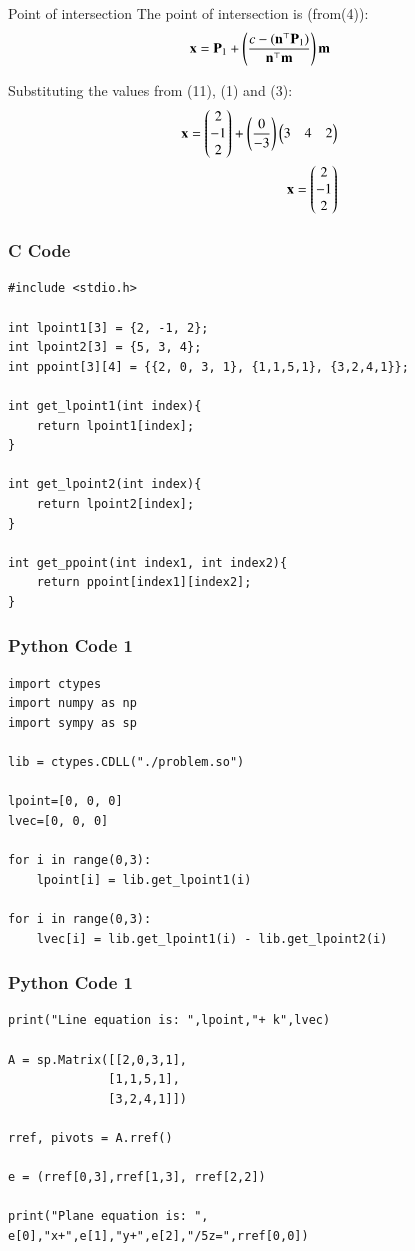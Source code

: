 \documentclass{beamer}
\begin{document}
\begin{frame}{Point of intersection}
The point of intersection is (from(4)):
\begin{align}
    \mathbf{x}=\mathbf{P}_1+\left(\frac{c-(\mathbf{n}^\top\mathbf{P}_1)}{\mathbf{n}^\top\mathbf{m}}\right)\mathbf{m}
\end{align}

Substituting the values from (11), (1) and (3):
\begin{align}
    \mathbf{x}=\begin{pmatrix}2\\-1\\2\end{pmatrix}+\left(\frac{0}{-3}\right)\begin{pmatrix}3&4&2\end{pmatrix}\\
    \mathbf{x}=\begin{pmatrix}2\\-1\\2\end{pmatrix}
\end{align}
\end{frame}


\begin{frame}[fragile]
    \frametitle{C Code}
    \begin{lstlisting}
#include <stdio.h>

int lpoint1[3] = {2, -1, 2};
int lpoint2[3] = {5, 3, 4};
int ppoint[3][4] = {{2, 0, 3, 1}, {1,1,5,1}, {3,2,4,1}};

int get_lpoint1(int index){
    return lpoint1[index];
}

int get_lpoint2(int index){
    return lpoint2[index];
}

int get_ppoint(int index1, int index2){
    return ppoint[index1][index2];
}
    \end{lstlisting}
\end{frame}

\begin{frame}[fragile]
    \frametitle{Python Code 1}
    \begin{lstlisting}
import ctypes
import numpy as np
import sympy as sp

lib = ctypes.CDLL("./problem.so")

lpoint=[0, 0, 0]
lvec=[0, 0, 0]

for i in range(0,3):
    lpoint[i] = lib.get_lpoint1(i)

for i in range(0,3):
    lvec[i] = lib.get_lpoint1(i) - lib.get_lpoint2(i)
    \end{lstlisting}
\end{frame}

\begin{frame}[fragile]
    \frametitle{Python Code 1}
    \begin{lstlisting}
print("Line equation is: ",lpoint,"+ k",lvec)

A = sp.Matrix([[2,0,3,1],
              [1,1,5,1],
              [3,2,4,1]])

rref, pivots = A.rref()

e = (rref[0,3],rref[1,3], rref[2,2])

print("Plane equation is: ", e[0],"x+",e[1],"y+",e[2],"/5z=",rref[0,0])
    \end{lstlisting}
\end{frame}
\end{document}
